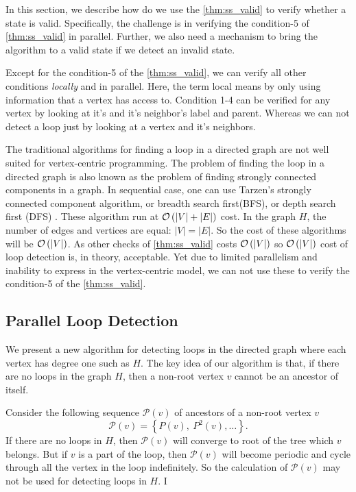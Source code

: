 %

In this section, we describe how do we use the  \cref{thm:ss_valid} to verify
whether a state is valid. Specifically, the challenge is in verifying the
condition-5 of \cref{thm:ss_valid} in parallel. Further, we also need a
mechanism to bring the algorithm to a valid state if we detect an invalid
state.


Except for the condition-5 of the \cref{thm:ss_valid}, we can verify all other
conditions \emph{locally} and in parallel.  Here, the term local means by only
using information that a vertex has access to. Condition 1-4 can be verified
for any vertex by looking at it's  and it's neighbor's label and parent.
Whereas we can not detect a loop just by looking at a vertex and it's
neighbors.

The traditional algorithms for finding a loop in a directed graph are not well
suited for vertex-centric programming. The problem of finding the loop in a
directed graph is also known as the problem of finding strongly connected
components in a graph. In sequential case, one can use Tarzen's strongly
connected component algorithm, or breadth search first(BFS), or depth search
first (DFS) .  These algorithm run at $\mathcal{O} \left ( |V| + |E| \right )$ cost.  In the
graph $H$, the number of edges and vertices are equal: $|V|=|E|$. So the cost
of these algorithms will be $\mathcal{O} \left ( |V|  \right )$. As other checks of
\cref{thm:ss_valid} costs $\mathcal{O} \left ( |V|  \right )$ so $\mathcal{O} \left ( |V|  \right )$ cost of loop
detection is, in theory, acceptable.  Yet due to limited parallelism and
inability to express in the vertex-centric model, we can not use these to
verify the condition-5 of the \cref{thm:ss_valid}.


\subsection{Parallel Loop Detection}

We present a new algorithm for detecting loops in the directed graph where
each vertex has degree one such as $H$. The key idea of our algorithm is that,
if there are no loops in the graph $H$, then a non-root vertex $v$ cannot be
an ancestor of itself.


Consider the following sequence $\mathcal{P}(v)$ of ancestors of a non-root vertex $v$ 
\begin{equation}
\mathcal{P}(v)=\left\{ P(v),\ P^{2}(v),\ldots\right\}. 
\end{equation}
%
If  there are no loops in $H$, then $\mathcal{P}(v)$ will converge to root of
the tree which $v$ belongs. But if $v$ is a part of the loop, then
$\mathcal{P}(v)$ will become periodic  and cycle through all the vertex in the
loop indefinitely.  So the calculation of  $\mathcal{P}(v)$ may not be used
for detecting loops in $H$.  I

